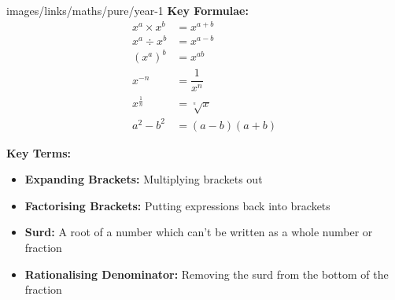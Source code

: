 \documentclass[fleqn]{article}
\begin{document}





\begin{keyinformation}{images/links/maths/pure/year-1}
    \textbf{Key Formulae:}
    \begin{align*}
        x^a \times x^b &= x^{a+b}                    \\
        x^a \div x^b &= x^{a-b}                      \\
        (x^a)^b &= x^{ab}                            \\
        x^{-n} &= \dfrac{1}{x^n}                     \\
        x^{\tfrac{1}{n}} &= \sqrt[\textstyle{^n}]{x} \\
        a^2 - b^2 &= (a-b)(a+b)
    \end{align*}

    \textbf{Key Terms:}
    \begin{itemize}
        \item \textbf{Expanding Brackets:} Multiplying brackets out
        \item \textbf{Factorising Brackets:} Putting expressions back into brackets
        \item \textbf{Surd:} A root of a number which can't be written as a whole number or fraction
        \item \textbf{Rationalising Denominator:} Removing the surd from the bottom of the fraction
    \end{itemize}
\end{keyinformation}



\newpage
\pagestyle{attribution}
\end{document}
